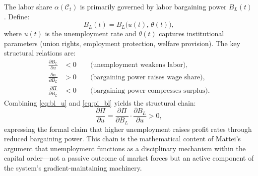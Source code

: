\documentclass[12pt,a4paper]{article}
\theoremstyle{definition}
\theoremstyle{remark}
\begin{document}
The labor share $\alpha(\mathcal{C}_t)$ is primarily governed by labor bargaining power $B_L(t)$. Define:
\begin{equation}
  B_L(t) = B_L\!\bigl(u(t),\, \theta(t)\bigr),
\end{equation}
where $u(t)$ is the unemployment rate and $\theta(t)$ captures institutional parameters (union rights, employment protection, welfare provision). The key structural relations are:
\begin{align}
  \frac{\partial B_L}{\partial u} &< 0 \label{eq:bl_u} \qquad\text{(unemployment weakens labor)},\\
  \frac{\partial \alpha}{\partial B_L} &> 0 \label{eq:alpha_bl} \qquad\text{(bargaining power raises wage share)},\\
  \frac{\partial \Pi}{\partial B_L} &< 0 \label{eq:pi_bl} \qquad\text{(bargaining power compresses surplus)}.
\end{align}
Combining \eqref{eq:bl_u} and \eqref{eq:pi_bl} yields the structural chain:
\begin{equation}
  \label{eq:gradient_chain}
  \frac{\partial \Pi}{\partial u} = \frac{\partial \Pi}{\partial B_L} \cdot \frac{\partial B_L}{\partial u} > 0,
\end{equation}
expressing the formal claim that higher unemployment raises profit rates through reduced bargaining power. This chain is the mathematical content of Mattei's argument that unemployment functions as a disciplinary mechanism within the capital order---not a passive outcome of market forces but an active component of the system's gradient-maintaining machinery.
\end{document}
